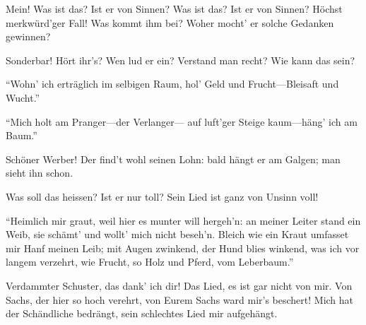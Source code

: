 \begin{drama}


Mein! Was ist das?
Ist er von Sinnen?
Was ist das?
Ist er von Sinnen?
Höchst merkwürd'ger Fall! Was kommt ihm bei?
Woher mocht' er solche Gedanken gewinnen?



Sonderbar! Hört ihr's? Wen lud er ein?
Verstand man recht? Wie kann das sein?

\Beckmesserspeaks


``Wohn' ich erträglich im selbigen Raum,
hol' Geld und Frucht---Bleisaft und Wucht.''


``Mich holt am Pranger---der Verlanger---
auf luft'ger Steige kaum---häng' ich am Baum.''



Schöner Werber! Der find't wohl seinen Lohn:
bald hängt er am Galgen; man sieht ihn schon.

Was soll das heissen?
Ist er nur toll?
Sein Lied ist ganz von Unsinn voll!

\Beckmesserspeaks


``Heimlich mir graut,
weil hier es munter will hergeh'n:
an meiner Leiter stand ein Weib,
sie schämt' und wollt' mich nicht beseh'n.
Bleich wie ein Kraut
umfasset mir Hanf meinen Leib;
mit Augen zwinkend, der Hund blies winkend,
was ich vor langem verzehrt,
wie Frucht, so Holz und Pferd,
vom Leberbaum.''



\Beckmesserspeaks


Verdammter Schuster, das dank' ich dir!
Das Lied, es ist gar nicht von mir.
Von Sachs, der hier so hoch verehrt,
von Eurem Sachs ward mir's beschert!
Mich hat der Schändliche bedrängt,
sein schlechtes Lied mir aufgehängt.




\end{drama}
